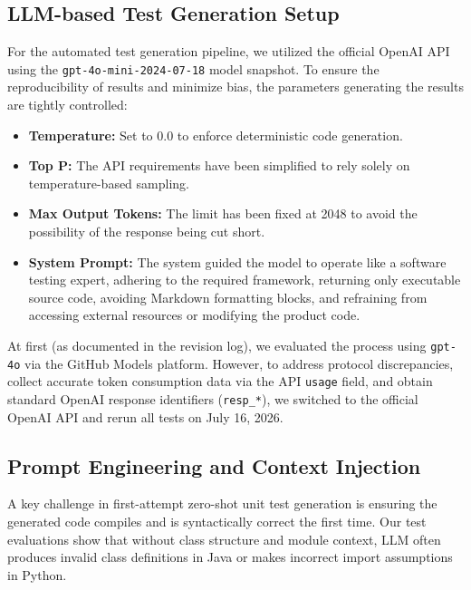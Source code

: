 
\subsection{LLM-based Test Generation Setup}
\label{subsec:llm_setup}

For the automated test generation pipeline, we utilized the official OpenAI API using the \texttt{gpt-4o-mini-2024-07-18} model snapshot. To ensure the reproducibility of results and minimize bias, the parameters generating the results are tightly controlled:
\begin{itemize}
    \item \textbf{Temperature:} Set to 0.0 to enforce deterministic code generation.
    \item \textbf{Top P:} The API requirements have been simplified to rely solely on temperature-based sampling.
    \item \textbf{Max Output Tokens:} The limit has been fixed at 2048 to avoid the possibility of the response being cut short.
    \item \textbf{System Prompt:} The system guided the model to operate like a software testing expert, adhering to the required framework, returning only executable source code, avoiding Markdown formatting blocks, and refraining from accessing external resources or modifying the product code.
\end{itemize}

At first (as documented in the revision log), we evaluated the process using \texttt{gpt-4o} via the GitHub Models platform. However, to address protocol discrepancies, collect accurate token consumption data via the API \texttt{usage} field, and obtain standard OpenAI response identifiers (\texttt{resp\_*}), we switched to the official OpenAI API and rerun all tests on July 16, 2026.

\subsection{Prompt Engineering and Context Injection}
\label{subsec:prompt_engineering}

A key challenge in first-attempt zero-shot unit test generation is ensuring the generated code compiles and is syntactically correct the first time. Our test evaluations show that without class structure and module context, LLM often produces invalid class definitions in Java or makes incorrect import assumptions in Python.

